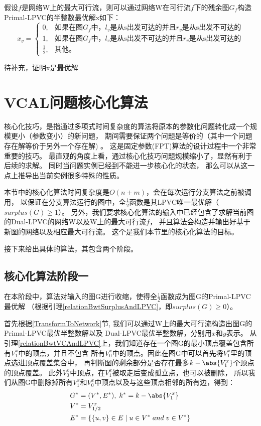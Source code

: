 假设$f$是网络W上的最大可行流，则可以通过网络W在可行流$f$下的残余图$G_f$构造Primal-LPVC的半整数最优解x如下：
\begin{equation*}
  x_v = \begin{cases}
            0, & \mbox{如果在图$G_f$中，$l_v$是从s出发可达的并且$r_v$是从s出发不可达的}  \\
            1, & \mbox{如果在图$G_f$中，$l_v$是从s出发不可达的并且$r_v$是从s出发可达的}  \\
            \frac{1}{2}, & \mbox{其他。}
          \end{cases}
\end{equation*}

\textcolor[rgb]{1.00,0.00,0.00}{待补充，证明x是最优解}

\section{VCAL问题核心化算法}
核心化技巧，是指通过多项式时间复杂度的算法将原本的参数化问题转化成一个规模更小（参数变小）的新问题，
期间需要保证两个问题是等价的（其中一个问题存在解等价于另外一个存在解) 。
这是固定参数(FPT)算法的设计过程中一个非常重要的技巧。
最直观的角度上看，通过核心化技巧问题规模缩小了，显然有利于后续的求解。
同时当问题实例已经到不能进一步核心化的状态，
那么可以从这一点上推导出当前实例很多特殊的性质。

本节中的核心化算法时间复杂度是$O(n + m)$，会在每次运行分支算法之前被调用，
以保证在分支算法运行的图中，全$\frac{1}{2}$函数是其LPVC唯一最优解（$surplus(G) \ge 1$）。
另外，我们要求核心化算法的输入中已经包含了求解当前图的Dual-LPVC的网络W以及W上的最大可行流$f$，
并且算法会构造并输出好基于新图的网络以及相应最大可行流。
这个是我们本节里的核心化算法的目标。

接下来给出具体的算法，其包含两个阶段。

\subsection{核心化算法阶段一}
在本阶段中，算法对输入的图G进行收缩，使得全$\frac{1}{2}$函数成为图G的Primal-LPVC最优解
（根据引理\ref{relationBwtSurplusAndLPVC}，即$surplus(G) \ge 0$）。
\vspace{0.5cm}

首先根据\ref{TransformToNetwork}节, 我们可以通过W上的最大可行流构造出图G的Primal-LPVC最优半整数解以及
Dual-LPVC最优半整数解，分别用$x$和$y$表示。
从引理\ref{relationBwtVCAndLPVC}上，我们知道存在一个图G的最小顶点覆盖包含所有$V^x_1$中的顶点，并且不包含
所有$V^x_0$中的顶点。因此在图G中可以首先将$V^x_1$里的顶点选进顶点覆盖集合中，
再判断图的剩余部分是否存在最多$k - \abs{V^x_1}$个顶点的顶点覆盖。
此外$V^x_0$中顶点，在$V^x_1$被取走后变成孤立点，也可以被删除，
所以我们从图G中删除掉所有$V^x_1$和$V^x_0$中顶点以及与这些顶点相邻的所有边，得到：
\begin{equation*}\begin{aligned}
    &G^* = (V^*, E^*),\;k^* = k - \abs{V^x_1} \\
    &V^* = V^x_{1/2} \\
    &E^* = \{\{u, v\} \in E\;|\;u \in V^*\;and\;v\in V^*\}
\end{aligned}\end{equation*}

